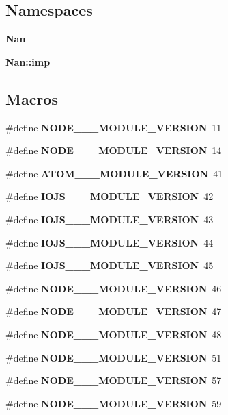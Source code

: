 \subsection*{Namespaces}
\begin{DoxyCompactItemize}
\item 
 \textbf{ Nan}
\item 
 \textbf{ Nan\+::imp}
\end{DoxyCompactItemize}
\subsection*{Macros}
\begin{DoxyCompactItemize}
\item 
\#define \textbf{ N\+O\+D\+E\+\_\+\_\+\_\+\+M\+O\+D\+U\+L\+E\+\_\+\+V\+E\+R\+S\+I\+ON}~11
\item 
\#define \textbf{ N\+O\+D\+E\+\_\+\_\+\_\+\+M\+O\+D\+U\+L\+E\+\_\+\+V\+E\+R\+S\+I\+ON}~14
\item 
\#define \textbf{ A\+T\+O\+M\+\_\+\_\+\_\+\+M\+O\+D\+U\+L\+E\+\_\+\+V\+E\+R\+S\+I\+ON}~41
\item 
\#define \textbf{ I\+O\+J\+S\+\_\+\_\+\_\+\+M\+O\+D\+U\+L\+E\+\_\+\+V\+E\+R\+S\+I\+ON}~42
\item 
\#define \textbf{ I\+O\+J\+S\+\_\+\_\+\_\+\+M\+O\+D\+U\+L\+E\+\_\+\+V\+E\+R\+S\+I\+ON}~43
\item 
\#define \textbf{ I\+O\+J\+S\+\_\+\_\+\_\+\+M\+O\+D\+U\+L\+E\+\_\+\+V\+E\+R\+S\+I\+ON}~44
\item 
\#define \textbf{ I\+O\+J\+S\+\_\+\_\+\_\+\+M\+O\+D\+U\+L\+E\+\_\+\+V\+E\+R\+S\+I\+ON}~45
\item 
\#define \textbf{ N\+O\+D\+E\+\_\+\_\+\_\+\+M\+O\+D\+U\+L\+E\+\_\+\+V\+E\+R\+S\+I\+ON}~46
\item 
\#define \textbf{ N\+O\+D\+E\+\_\+\_\+\_\+\+M\+O\+D\+U\+L\+E\+\_\+\+V\+E\+R\+S\+I\+ON}~47
\item 
\#define \textbf{ N\+O\+D\+E\+\_\+\_\+\_\+\+M\+O\+D\+U\+L\+E\+\_\+\+V\+E\+R\+S\+I\+ON}~48
\item 
\#define \textbf{ N\+O\+D\+E\+\_\+\_\+\_\+\+M\+O\+D\+U\+L\+E\+\_\+\+V\+E\+R\+S\+I\+ON}~51
\item 
\#define \textbf{ N\+O\+D\+E\+\_\+\_\+\_\+\+M\+O\+D\+U\+L\+E\+\_\+\+V\+E\+R\+S\+I\+ON}~57
\item 
\#define \textbf{ N\+O\+D\+E\+\_\+\_\+\_\+\+M\+O\+D\+U\+L\+E\+\_\+\+V\+E\+R\+S\+I\+ON}~59
\item 

\end{DoxyCompactItemize}
